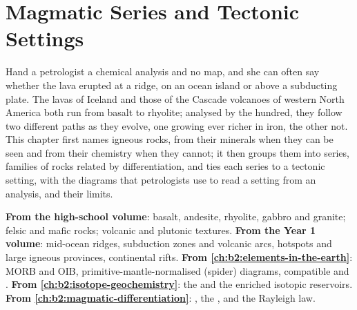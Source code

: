 \chapter{Magmatic Series and Tectonic Settings}\label{ch:b2:magmatic-series}

Hand a petrologist a chemical analysis and no map, and she can often say whether the
lava erupted at a ridge, on an ocean island or above a subducting plate. The lavas
of Iceland and those of the Cascade volcanoes of western North America both run
from basalt to rhyolite; analysed by the hundred, they follow two different paths as
they evolve, one growing ever richer in iron, the other not. This chapter first
names igneous rocks, from their minerals when they can be seen and from their
chemistry when they cannot; it then groups them into series, families of rocks
related by differentiation, and ties each series to a tectonic setting, with the
diagrams that petrologists use to read a setting from an analysis, and their limits.

\begin{recall}
\textbf{From the high-school volume}: basalt, andesite, rhyolite, gabbro and granite;
felsic and mafic rocks; volcanic and plutonic textures. \textbf{From the Year 1
volume}: mid-ocean ridges, subduction zones and volcanic arcs, hotspots and large
igneous provinces, continental rifts. \textbf{From \cref{ch:b2:elements-in-the-earth}}:
MORB and OIB, primitive-mantle-normalised (spider) diagrams, compatible and
. \textbf{From \cref{ch:b2:isotope-geochemistry}}: the  and the enriched isotopic reservoirs. \textbf{From
\cref{ch:b2:magmatic-differentiation}}: , the ,  and the Rayleigh law.
\end{recall}

